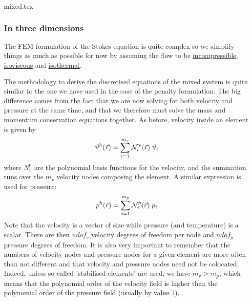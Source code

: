 \begin{flushright} {\tiny {\color{gray} mixed.tex}} \end{flushright}

\subsubsection{In three dimensions}

The FEM formulation of the Stokes equation is quite complex so 
we simplify things as much as possible for now by 
assuming the flow to be \underline{incompressible}, 
\underline{isoviscous} and \underline{isothermal}. 

The methodology to derive the discretised equations of the mixed system is 
quite similar to the one we have used in the case of the penalty formulation.
The big difference comes from the fact that we are now solving for both 
velocity and pressure at the same time, and that we therefore must solve 
the mass and momentum conservation equations together.
As before, velocity inside an element is given by 
\begin{equation}
{\vec \upnu}^h({\vec r})=\sum_{i=1}^{m_v} {\mathcal{N}}_i^\upnu({\vec r})\;  {\vec \upnu}_i
\label{mixed01}
\end{equation}
where $N_i^{\upnu}$ are the polynomial basis functions for the velocity,
and the summation runs over the $m_v$ velocity nodes composing the element.
A similar expression is used for pressure:
\begin{equation}
p^h({\vec r})=\sum_{i=1}^{m_p} {\mathcal{N}}_i^p({\vec r}) \; p_i
\label{mixed02}
\end{equation}
Note that the velocity is a vector of size while pressure (and temperature)
is a scalar. There are then $ndof_v$ velocity degrees of freedom per node
and $ndof_p$ pressure degrees of freedom.
It is also very important to remember that the numbers of 
velocity nodes and pressure nodes for a given element 
are more often than not different and that velocity and pressure
nodes need not be colocated. Indeed, unless 
so-called 'stabilised elements' are used, we have $m_v>m_p$, which 
means that the polynomial order of the velocity field is higher than 
the polynomial order of the pressure field (usually by value 1).

